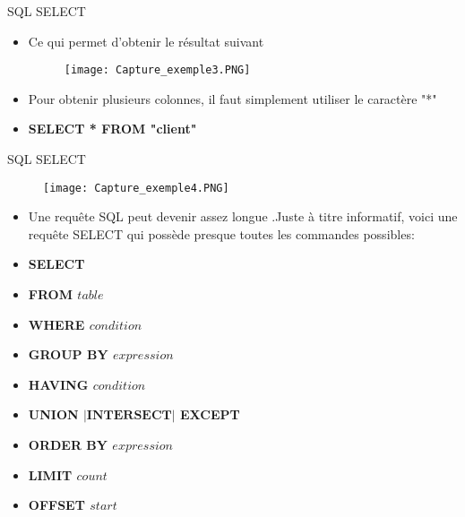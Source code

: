 \documentclass{beamer}
\begin{document}
\begin{frame}{SQL SELECT}
\begin{itemize}
    \item Ce qui permet d'obtenir le r\'esultat suivant
              \begin{figure}[h]
\centering	
 \texttt{[image: Capture\_exemple3.PNG]}
 \end{figure}
 \item Pour obtenir plusieurs colonnes, il faut simplement utiliser le caract\`ere "*"
 \item \textbf{SELECT * FROM "client"}

\end{itemize}
\end{frame}
\begin{frame}{SQL SELECT}
              \begin{figure}[h]
\centering	
 \texttt{[image: Capture\_exemple4.PNG]}
 \end{figure}
 \end{frame}
 \begin{frame}
 \begin{itemize}
     \item Une requ\^ete SQL peut devenir assez longue .Juste \`a titre informatif, voici une requ\^ete SELECT qui poss\`ede presque toutes les commandes possibles:
     \item \textbf{SELECT}
     \item \textbf{FROM $table$}
     \item \textbf{WHERE $condition$}
     \item \textbf{GROUP BY $expression$}
     \item \textbf{HAVING $condition$}
     \item \textbf{{UNION $|\textbf{INTERSECT}|$ EXCEPT }}
     \item \textbf{ORDER BY $expression$}
     \item \textbf{LIMIT $count$}
     \item \textbf{OFFSET $start$}
 \end{itemize}
    


    
\end{frame}
\end{document}
